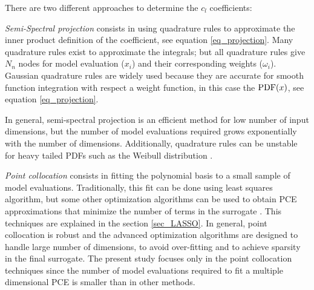 \documentclass[preprint,12pt]{elsarticle}
\begin{document}






There are two different approaches to determine the $c_l$ coefficients:

\emph{Semi-Spectral projection} consists in using quadrature rules to approximate the inner product definition of the coefficient, see equation \ref{eq_projection}. Many quadrature rules exist to approximate the integrals; but all quadrature rules give $N_n$ nodes for model evaluation ($x_i$) and their corresponding weights ($\omega_i$). Gaussian quadrature rules are widely used because they are accurate for smooth function integration with respect a weight function, in this case the $\mathrm{PDF}(x)$, see equation \ref{eq_projection}.


\noindent In general, semi-spectral projection is an efficient method for low number of input dimensions, but the number of model evaluations required grows exponentially with the number of dimensions. Additionally, quadrature rules can be unstable for heavy tailed PDFs such as the Weibull distribution \cite{gautschi1994algorithm}.

\emph{Point collocation} consists in fitting the polynomial basis to a small sample of model evaluations. Traditionally, this fit can be done using least squares algorithm, but some other optimization algorithms can be used to obtain PCE approximations that minimize the number of  terms in the surrogate \cite{blatman2011adaptive,pedregosa2011scikit,tibshirani1996regression}. This techniques are explained in the section \ref{sec_LASSO}. In general, point collocation is robust and the advanced optimization algorithms are designed to handle large number of dimensions, to avoid over-fitting and to achieve sparsity in the final surrogate. The present study focuses only in the point collocation techniques since the number of model evaluations required to fit a multiple dimensional PCE is smaller \cite{blatman2011adaptive} than in other methods.
\end{document}
